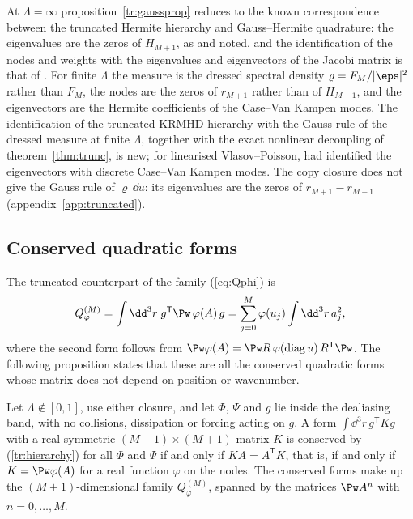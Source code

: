 At $\Lambda=\infty$ proposition~\ref{tr:gaussprop} reduces to the known correspondence between the truncated Hermite hierarchy and Gauss--Hermite quadrature: the eigenvalues are the zeros of $H_{M+1}$, as \citet{ParkerDellar2015} and \citet{Tassi2022} noted, and the identification of the nodes and weights with the eigenvalues and eigenvectors of the Jacobi matrix is that of \citet{GolubWelsch1969}. For finite $\Lambda$ the measure is the dressed spectral density $\varrho=F_M/|\eps|^2$ rather than $F_M$, the nodes are the zeros of $r_{M+1}$ rather than of $H_{M+1}$, and the eigenvectors are the Hermite coefficients of the Case--Van Kampen modes. The identification of the truncated KRMHD hierarchy with the Gauss rule of the dressed measure at finite $\Lambda$, together with the exact nonlinear decoupling of theorem~\ref{thm:trunc}, is new; for linearised Vlasov--Poisson, \citet{ParkerDellar2015} had identified the eigenvectors with discrete Case--Van Kampen modes. The copy closure does not give the Gauss rule of $\varrho\,\dd u$: its eigenvalues are the zeros of $r_{M+1}-r_{M-1}$ (appendix~\ref{app:truncated}).

\subsection{Conserved quadratic forms}\label{tr:formsec}

The truncated counterpart of the family (\ref{eq:Qphi}) is
\begin{equation*}
  Q^{(M)}_\varphi=\int\dd^3r\;g^{\mathsf T}\Pw\,\varphi(A)\,g=\sum_{j=0}^M\varphi(u_j)\int\dd^3r\,a_j^2 ,
\end{equation*}
where the second form follows from $\Pw\varphi(A)=\Pw R\,\varphi(\mathrm{diag}\,u)\,R^{\mathsf T}\Pw$. The following proposition states that these are all the conserved quadratic forms whose matrix does not depend on position or wavenumber.

\begin{proposition}\label{tr:formsprop}
Let $\Lambda\notin[0,1]$, use either closure, and let $\Phi$, $\Psi$ and $g$ lie inside the dealiasing band, with no collisions, dissipation or forcing acting on $g$. A form $\int\dd^3r\,g^{\mathsf T}Kg$ with a real symmetric $(M+1)\times(M+1)$ matrix $K$ is conserved by (\ref{tr:hierarchy}) for all $\Phi$ and $\Psi$ if and only if $KA=A^{\mathsf T}K$, that is, if and only if $K=\Pw\varphi(A)$ for a real function $\varphi$ on the nodes. The conserved forms make up the $(M+1)$-dimensional family $Q^{(M)}_\varphi$, spanned by the matrices $\Pw A^n$ with $n=0,\dots,M$.
\end{proposition}

